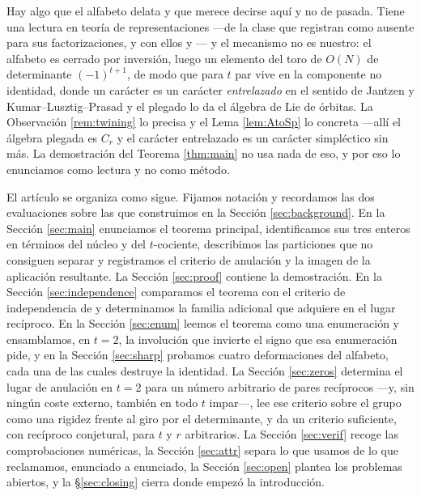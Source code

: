 \documentclass[11pt,reqno]{amsart}
\theoremstyle{plain}
\theoremstyle{definition}
\begin{document}
Hay algo que el alfabeto delata y que merece decirse aquí y no de pasada. Tiene una lectura en
teoría de representaciones ---de la clase que \cite{CK09} registran como ausente para sus
factorizaciones, y con ellos \cite{AB19} y \cite{AK25}--- y el mecanismo no es nuestro: el alfabeto
es cerrado por inversión, luego
un elemento del toro de $O(N)$ de determinante $(-1)^{t+1}$, de modo que para $t$ par vive en la
componente no identidad, donde un carácter es un carácter \emph{entrelazado} en el sentido de
Jantzen \cite{Jantzen} y Kumar--Lusztig--Prasad \cite{KLP} y el plegado lo da el álgebra de Lie de
órbitas. La Observación \ref{rem:twining} lo precisa y el Lema \ref{lem:AtoSp} lo concreta ---allí el
álgebra plegada es $C_r$ y el carácter entrelazado es un carácter simpléctico sin más. La
demostración del Teorema \ref{thm:main} no usa nada de eso, y por eso lo enunciamos como lectura y no
como método.

El artículo se organiza como sigue. Fijamos notación y recordamos las dos evaluaciones sobre las que
construimos en la Sección \ref{sec:background}. En la Sección \ref{sec:main} enunciamos el teorema
principal, identificamos sus tres enteros en términos del núcleo y del $t$-cociente, describimos las
particiones que no consiguen separar y registramos el criterio de
anulación y la imagen de la aplicación resultante. La Sección \ref{sec:proof} contiene la
demostración. En la Sección \ref{sec:independence} comparamos el teorema con el criterio de
independencia de \cite{AK25} y determinamos la familia adicional que adquiere en el lugar recíproco.
En la Sección \ref{sec:enum} leemos el teorema como una enumeración y ensamblamos, en $t=2$, la
involución que invierte el signo que esa enumeración pide, y en la Sección
\ref{sec:sharp} probamos cuatro deformaciones del alfabeto, cada una de las cuales destruye la
identidad. La Sección \ref{sec:zeros} determina
el lugar de anulación en $t=2$ para un número arbitrario de pares recíprocos ---y, sin ningún coste
externo, también en todo $t$ impar---, lee ese criterio sobre el grupo como una rigidez frente al
giro por el determinante, y da un criterio suficiente, con recíproco conjetural, para $t$ y $r$
arbitrarios. La Sección \ref{sec:verif} recoge las
comprobaciones numéricas, la Sección \ref{sec:attr} separa lo que usamos de lo que reclamamos,
enunciado a enunciado, la Sección \ref{sec:open} plantea los problemas abiertos, y la \S\ref{sec:closing} cierra donde
empezó la introducción.
\end{document}
